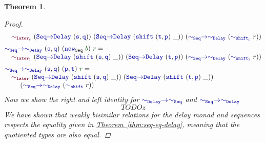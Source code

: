 \documentclass[twoside,11pt,openright]{report}
\theoremstyle{plain} %
\newtheorem{thm}{Theorem}[section]
\theoremstyle{definition}
\theoremstyle{remark}
\newcommand*{\thmref}[1]{\hyperref[thm:#1]{Theorem~\ref*{thm:#1}}} %
\newcommand*{\term}[1]{\textcolor{green!30!black}{#1}} %
\newcommand*{\function}[1]{\textcolor{blue!60!black}{\ensuremath{\mathtt{#1}}}}
\newcommand*{\constructor}[1]{\textcolor{purple!60!black}{\ensuremath{\mathtt{#1}}}}
\begin{document}
\begin{thm}
\begin{proof}
\begin{equation}
\begin{aligned}
        &\quad\constructor{\sim_{later_r}}~(\function{Seq{\rightarrow}Delay}~(\function{s},\function{q}))~(\function{Seq{\rightarrow}Delay}~(\function{shift}~(\function{t},\function{p})~\_))~(\function{{\sim}_{Seq}{\rightarrow}{\sim}_{Delay}}~(\function{\sim_{shift_r}}~r)) \\[1mm]
        &\function{{\sim}_{Seq}{\rightarrow}{\sim}_{Delay}}~(\function{s},\function{q})~(\function{now}_{\mathtt{Seq}}~\term{b})~\term{r} = \\[-1mm]
        &\quad\constructor{\sim_{later_l}}~(\function{Seq{\rightarrow}Delay}~(\function{shift}~(\function{s},\function{q})~\_))~(\function{Seq{\rightarrow}Delay}~(\function{t},\function{p}))~(\function{{\sim}_{Seq}{\rightarrow}{\sim}_{Delay}}~(\function{\sim_{shift_l}}~r)) \\[1mm]
        &\function{{\sim}_{Seq}{\rightarrow}{\sim}_{Delay}}~(\function{s},\function{q})~(\function{p},\function{t})~\term{r} = \\[-1mm]
        &\quad\constructor{\sim_{later}}~(\function{Seq{\rightarrow}Delay}~(\function{shift}~(\function{s},\function{q})~\_))~(\function{Seq{\rightarrow}Delay}~(\function{shift}~(\function{t},\function{p})~\_))\\[-1mm]
        &\quad\quad~(\function{{\sim}_{Seq}{\rightarrow}{\sim}_{Delay}}~(\function{\sim_{shift}}~r))
    \end{aligned}
  \end{equation}
  Now we show the right and left identity for \(\function{{\sim}_{Delay}{\rightarrow}{\sim}_{Seq}}\) and \(\function{{\sim}_{Seq}{\rightarrow}{\sim}_{Delay}}\) 
  \begin{equation}
    TODOz
  \end{equation}
  We have shown that weakly bisimilar relations for the delay monad and sequences respects the equality given in \thmref{seq-eq-delay}, meaning that the quotiented types are also equal. 
  \end{proof}
\end{thm}
\end{document}

